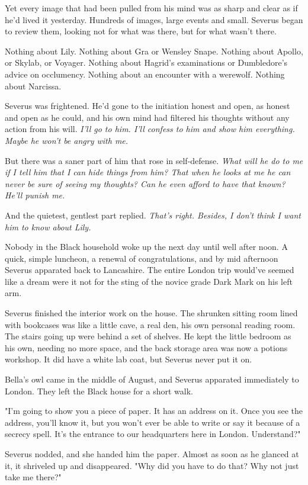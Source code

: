 Yet every image that had been pulled from his mind was as sharp and clear as if he'd lived it yesterday. Hundreds of images, large events and small. Severus began to review them, looking not for what was there, but for what wasn't there.

Nothing about Lily. Nothing about Gra or Wensley Snape. Nothing about Apollo, or Skylab, or Voyager. Nothing about Hagrid's examinations or Dumbledore's advice on occlumency. Nothing about an encounter with a werewolf. Nothing about Narcissa.

Severus was frightened. He'd gone to the initiation honest and open, as honest and open as he could, and his own mind had filtered his thoughts without any action from his will. \emph{I'll go to him. I'll confess to him and show him everything. Maybe he won't be angry with me.}

But there was a saner part of him that rose in self-defense. \emph{What will he do to me if I tell him that I can hide things from him? That when he looks at me he can never be sure of seeing my thoughts? Can he even afford to have that known? He'll punish me.}

And the quietest, gentlest part replied. \emph{That's right. Besides, I don't think I want him to know about Lily.}

Nobody in the Black household woke up the next day until well after noon. A quick, simple luncheon, a renewal of congratulations, and by mid afternoon Severus apparated back to Lancashire. The entire London trip would've seemed like a dream were it not for the sting of the novice grade Dark Mark on his left arm.

Severus finished the interior work on the house. The shrunken sitting room lined with bookcases was like a little cave, a real den, his own personal reading room. The stairs going up were behind a set of shelves. He kept the little bedroom as his own, needing no more space, and the back storage area was now a potions workshop. It did have a white lab coat, but Severus never put it on.

Bella's owl came in the middle of August, and Severus apparated immediately to London. They left the Black house for a short walk.

"I'm going to show you a piece of paper. It has an address on it. Once you see the address, you'll know it, but you won't ever be able to write or say it because of a secrecy spell. It's the entrance to our headquarters here in London. Understand?"

Severus nodded, and she handed him the paper. Almost as soon as he glanced at it, it shriveled up and disappeared. "Why did you have to do that? Why not just take me there?"


